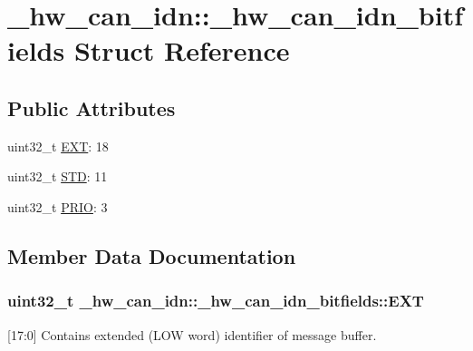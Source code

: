 \hypertarget{struct__hw__can__idn_1_1__hw__can__idn__bitfields}{}\section{\+\_\+hw\+\_\+can\+\_\+idn\+:\+:\+\_\+hw\+\_\+can\+\_\+idn\+\_\+bitfields Struct Reference}
\label{struct__hw__can__idn_1_1__hw__can__idn__bitfields}
\subsection*{Public Attributes}
\begin{DoxyCompactItemize}
\item 
uint32\+\_\+t \hyperlink{struct__hw__can__idn_1_1__hw__can__idn__bitfields_ad0c36c721f92ffb16416438259382ab8}{E\+XT}\+: 18
\item 
uint32\+\_\+t \hyperlink{struct__hw__can__idn_1_1__hw__can__idn__bitfields_ac2fdcabce14c724133528a033da25390}{S\+TD}\+: 11
\item 
uint32\+\_\+t \hyperlink{struct__hw__can__idn_1_1__hw__can__idn__bitfields_a6e38ea9c0282c7080cb681bdef48e4c3}{P\+R\+IO}\+: 3
\end{DoxyCompactItemize}


\subsection{Member Data Documentation}
\subsubsection[{\texorpdfstring{E\+XT}{EXT}}]{\setlength{\rightskip}{0pt plus 5cm}uint32\+\_\+t \+\_\+hw\+\_\+can\+\_\+idn\+::\+\_\+hw\+\_\+can\+\_\+idn\+\_\+bitfields\+::\+E\+XT}\hypertarget{struct__hw__can__idn_1_1__hw__can__idn__bitfields_ad0c36c721f92ffb16416438259382ab8}{}\label{struct__hw__can__idn_1_1__hw__can__idn__bitfields_ad0c36c721f92ffb16416438259382ab8}
\mbox{[}17\+:0\mbox{]} Contains extended (L\+OW word) identifier of message buffer. 
